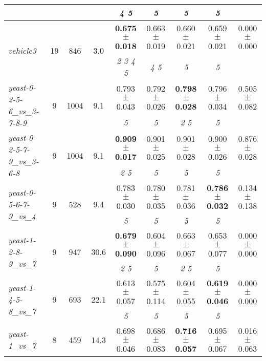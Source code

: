 \begin{table}[ht]
{\begin{tabular}{lcccccccc}
 & & &  & \textit{4 5 } & \textit{5 } & \textit{5 } & \textit{5 } & \textit{} \\ \bottomrule
\multirow{2}{*}{\textit{vehicle3}} & \multirow{2}{*}{19} & \multirow{2}{*}{846} & \multirow{2}{*}{3.0} & \textbf{0.675 $\pm$ 0.018} & 0.663 $\pm$ 0.019 & 0.660 $\pm$ 0.021 & 0.659 $\pm$ 0.021 & 0.000 $\pm$ 0.000 \\
 & & &  & \textit{2 3 4 5 } & \textit{4 5 } & \textit{5 } & \textit{5 } & \textit{} \\ \bottomrule
\multirow{2}{*}{\textit{yeast-0-2-5-6\_vs\_3-7-8-9}} & \multirow{2}{*}{9} & \multirow{2}{*}{1004} & \multirow{2}{*}{9.1} & 0.793 $\pm$ 0.043 & 0.792 $\pm$ 0.026 & \textbf{0.798 $\pm$ 0.028} & 0.796 $\pm$ 0.034 & 0.505 $\pm$ 0.082 \\
 & & &  & \textit{5 } & \textit{5 } & \textit{2 5 } & \textit{5 } & \textit{} \\ \bottomrule
\multirow{2}{*}{\textit{yeast-0-2-5-7-9\_vs\_3-6-8}} & \multirow{2}{*}{9} & \multirow{2}{*}{1004} & \multirow{2}{*}{9.1} & \textbf{0.909 $\pm$ 0.017} & 0.901 $\pm$ 0.025 & 0.901 $\pm$ 0.028 & 0.900 $\pm$ 0.026 & 0.876 $\pm$ 0.028 \\
 & & &  & \textit{2 5 } & \textit{5 } & \textit{5 } & \textit{5 } & \textit{} \\ \bottomrule
\multirow{2}{*}{\textit{yeast-0-5-6-7-9\_vs\_4}} & \multirow{2}{*}{9} & \multirow{2}{*}{528} & \multirow{2}{*}{9.4} & 0.783 $\pm$ 0.030 & 0.780 $\pm$ 0.035 & 0.781 $\pm$ 0.036 & \textbf{0.786 $\pm$ 0.032} & 0.134 $\pm$ 0.138 \\
 & & &  & \textit{5 } & \textit{5 } & \textit{5 } & \textit{5 } & \textit{} \\ \bottomrule
\multirow{2}{*}{\textit{yeast-1-2-8-9\_vs\_7}} & \multirow{2}{*}{9} & \multirow{2}{*}{947} & \multirow{2}{*}{30.6} & \textbf{0.679 $\pm$ 0.090} & 0.604 $\pm$ 0.096 & 0.663 $\pm$ 0.067 & 0.653 $\pm$ 0.077 & 0.000 $\pm$ 0.000 \\
 & & &  & \textit{2 5 } & \textit{5 } & \textit{2 5 } & \textit{5 } & \textit{} \\ \bottomrule
\multirow{2}{*}{\textit{yeast-1-4-5-8\_vs\_7}} & \multirow{2}{*}{9} & \multirow{2}{*}{693} & \multirow{2}{*}{22.1} & 0.613 $\pm$ 0.057 & 0.575 $\pm$ 0.114 & 0.604 $\pm$ 0.055 & \textbf{0.619 $\pm$ 0.046} & 0.000 $\pm$ 0.000 \\
 & & &  & \textit{5 } & \textit{5 } & \textit{5 } & \textit{5 } & \textit{} \\ \bottomrule
\multirow{2}{*}{\textit{yeast-1\_vs\_7}} & \multirow{2}{*}{8} & \multirow{2}{*}{459} & \multirow{2}{*}{14.3} & 0.698 $\pm$ 0.046 & 0.686 $\pm$ 0.083 & \textbf{0.716 $\pm$ 0.057} & 0.695 $\pm$ 0.067 & 0.016 $\pm$ 0.063 \\

\end{tabular}}
\end{table}
